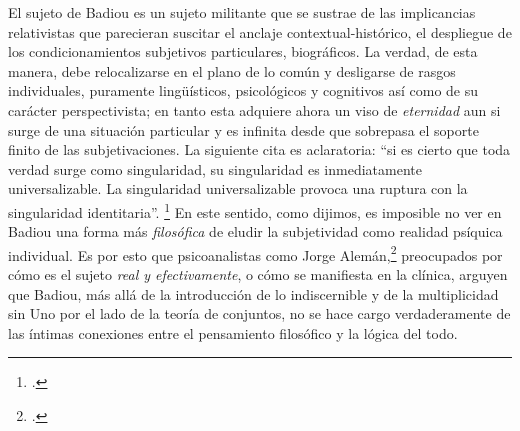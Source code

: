 El sujeto de Badiou es un sujeto militante que se sustrae de las implicancias relativistas que parecieran suscitar el anclaje contextual-histórico, el despliegue de los condicionamientos subjetivos particulares, biográficos. La verdad, de esta manera, debe relocalizarse en el plano de lo común y desligarse de rasgos individuales, puramente lingüísticos, psicológicos y cognitivos así como de su carácter perspectivista; en tanto esta adquiere ahora un viso de \emph{eternidad} aun si surge de una situación particular y es infinita desde que sobrepasa el soporte finito de las subjetivaciones. La siguiente cita es aclaratoria: \enquote{si es cierto que toda verdad surge como singularidad, su singularidad es inmediatamente universalizable. La singularidad universalizable provoca una ruptura con la singularidad identitaria}. \footcite[][12]{@7018-BADIOU1999} En este sentido, como dijimos, es imposible no ver en Badiou una forma más \emph{filosófica} de eludir la subjetividad como realidad psíquica individual. Es por esto que psicoanalistas como Jorge Alemán,\footcite[][]{@7017-ALEMAN2000} preocupados por cómo es el sujeto \emph{real y efectivamente}, o cómo se manifiesta en la clínica, arguyen que Badiou, más allá de la introducción de lo indiscernible y de la multiplicidad sin Uno por el lado de la teoría de conjuntos, no se hace cargo verdaderamente de las íntimas conexiones entre el pensamiento filosófico y la lógica del todo.

